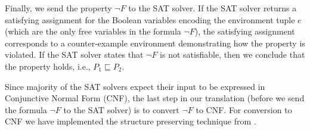 Finally, we send the property $\neg F$ to the SAT solver.  If the SAT
solver returns a satisfying assignment for the Boolean variables
encoding the environment tuple $e$ (which are the only free variables
in the formula $\neg F$), the satisfying assignment corresponds to a
counter-example environment demonstrating how the property is
violated.  If the SAT solver states that $\neg F$ is not satisfiable,
then we conclude that the property holds, i.e., $P_1 \sqsubseteq P_2$.

Since majority of the SAT solvers expect their input to be expressed
in Conjunctive Normal Form (CNF), the last step in our translation
(before we send the formula $\neg F$ to the SAT solver) is to convert
$\neg F$ to CNF.  For conversion to CNF we have implemented the
structure preserving technique from \cite{plaisted86structure}.


